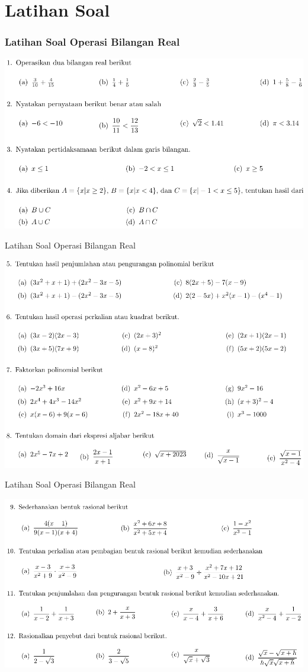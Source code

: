 \documentclass[pdflatex,compress,mathserif]{beamer}
\begin{document}
\section{Latihan Soal}

\begin{frame}
	\frametitle{Latihan Soal Operasi Bilangan Real}
	\begin{center}
		\includegraphics[width=0.8\linewidth]{img/img44}
	\end{center}
\end{frame}

\begin{frame}{Latihan Soal Operasi Bilangan Real}
	\begin{center}
		\includegraphics[width=0.8\linewidth]{img/img45}
	\end{center}
\end{frame}

\begin{frame}{Latihan Soal Operasi Bilangan Real}
	\begin{center}
		\includegraphics[width=0.8\linewidth]{img/img46}
	\end{center}
\end{frame}
\end{document}
